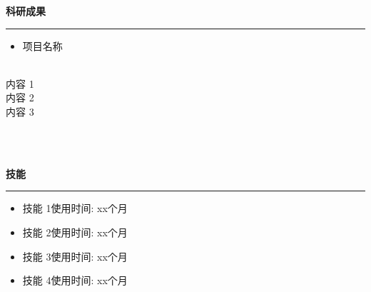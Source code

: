 \documentclass{article}
\theoremstyle{plain}
\begin{document}
\begin{flushleft}
\MakeUppercase{\LARGE\textbf{科研成果}} 
\end{flushleft}  %
\rule[4pt]{18cm}{0.5pt} %
\begin{itemize}
	\item{\normalsize{项目名称}}
\end{itemize}
\\{内容 1}
\\{内容 2}
\\
{内容 3}

\\\hspace*{\fill}\\ %




\begin{flushleft}
\MakeUppercase{\LARGE\textbf{技能}} %
\end{flushleft}
\rule[4pt]{18cm}{0.5pt} %
\begin{itemize}
	\item{\normalsize{技能 1}\hfill{使用时间: xx个月}}
	\item{\normalsize{技能 2}\hfill{使用时间: xx个月}}
	\item{\normalsize{技能 3}\hfill{使用时间: xx个月}}
	\item{\normalsize{技能 4}\hfill{使用时间: xx个月}}
\end{itemize}
\end{document}
